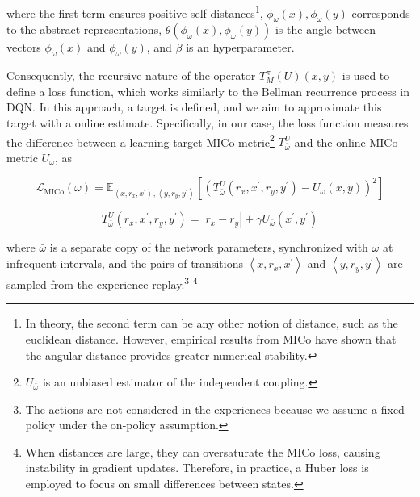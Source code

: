 where the first term ensures positive self-distances\footnote{In theory, the second term can be any other notion of distance, such as the euclidean distance. However, empirical results from MICo\cite{castro2021mico} have shown that the angular distance provides greater numerical stability.}, $\phi_\omega(x), \phi_\omega(y)$ corresponds to the abstract representations, $\theta\left(\phi_\omega(x), \phi_\omega(y)\right)$ is the angle between vectors $\phi_\omega(x)$ and $\phi_\omega(y)$, and $\beta$ is an hyperparameter.

Consequently, the recursive nature of the operator \(T_M^\pi(U)(x,y)\) is used to define a loss function, which works similarly to the Bellman recurrence process in DQN. In this approach, a target is defined, and we aim to approximate this target with a online estimate. Specifically, in our case, the loss function measures the difference between a learning target MICo metric\footnote{\(U_{\bar{\omega}}\) is an unbiased estimator of the independent coupling.} \(T_{\bar{\omega}}^U\) and the online MICo metric \(U_\omega\), as 

\begin{equation}
\label{eq:mico_loss}
    \mathcal{L}_{\mathrm{MICo}}(\omega)=\mathbb{E}_{\left\langle x, r_x, x^{\prime}\right\rangle,\left\langle y, r_y, y^{\prime}\right\rangle}\left[\left(T_{\bar{\omega}}^U\left(r_x, x^{\prime}, r_y, y^{\prime}\right)-U_\omega(x, y)\right)^2\right]
\end{equation}

\begin{equation}
    T_{\bar{\omega}}^U\left(r_x, x^{\prime}, r_y, y^{\prime}\right)=\left|r_x-r_y\right|+\gamma U_{\bar{\omega}}\left(x^{\prime}, y^{\prime}\right)
\end{equation}

where \(\bar{\omega}\) is a separate copy of the network parameters, synchronized with \(\omega\) at infrequent intervals, and the pairs of transitions \(\left\langle x, r_x, x^{\prime}\right\rangle\) and \(\left\langle y, r_y, y^{\prime}\right\rangle\) are sampled from the experience replay.\footnote{The actions are not considered in the experiences because we assume a fixed policy under the on-policy assumption.} \footnote{When distances are large, they can oversaturate the MICo loss, causing instability in gradient updates. Therefore, in practice, a Huber loss is employed to focus on small differences between states.}

